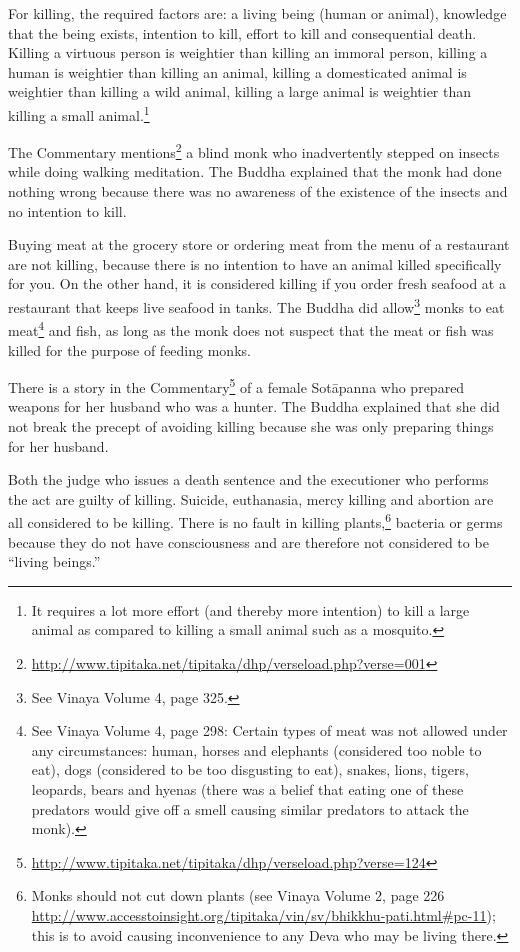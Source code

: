 For killing, the required factors are: a living being (human or animal), knowledge that the being exists, intention to kill, effort to kill and consequential death. Killing a virtuous person is weightier than killing an immoral person, killing a human is weightier than killing an animal, killing a domesticated animal is weightier than killing a wild animal, killing a large animal is weightier than killing a small animal.\footnote{It requires a lot more effort (and thereby more intention) to kill a large animal as compared to killing a small animal such as a mosquito.}

The Commentary mentions\footnote{\url{http://www.tipitaka.net/tipitaka/dhp/verseload.php?verse=001}} a blind monk who inadvertently stepped on insects while doing walking meditation. The Buddha explained that the monk had done nothing wrong because there was no awareness of the existence of the insects and no intention to kill. 

Buying meat at the grocery store or ordering meat from the menu of a restaurant are not killing, because there is no intention to have an animal killed specifically for you. On the other hand, it is considered killing if you order fresh seafood at a restaurant that keeps live seafood in tanks. The Buddha did allow\footnote{See Vinaya Volume 4, page 325.} monks to eat meat\footnote{See Vinaya Volume 4, page 298: Certain types of meat was not allowed under any circumstances: human, horses and elephants (considered too noble to eat), dogs (considered to be too disgusting to eat), snakes, lions, tigers, leopards, bears and hyenas (there was a belief that eating one of these predators would give off a smell causing similar predators to attack the monk).} and fish, as long as the monk does not suspect that the meat or fish was killed for the purpose of feeding monks.

There is a story in the Commentary\footnote{\url{http://www.tipitaka.net/tipitaka/dhp/verseload.php?verse=124}} of a female Sotāpanna who prepared weapons for her husband who was a hunter. The Buddha explained that she did not break the precept of avoiding killing because she was only preparing things for her husband.

Both the judge who issues a death sentence and the executioner who performs the act are guilty of killing. Suicide, euthanasia, mercy killing and abortion are all considered to be killing. There is no fault in killing plants,\footnote{Monks should not cut down plants (see Vinaya Volume 2, page 226 \url{http://www.accesstoinsight.org/tipitaka/vin/sv/bhikkhu-pati.html\#pc-11}); this is to avoid causing inconvenience to any Deva who may be living there.} bacteria or germs because they do not have consciousness and are therefore not considered to be “living beings.”

